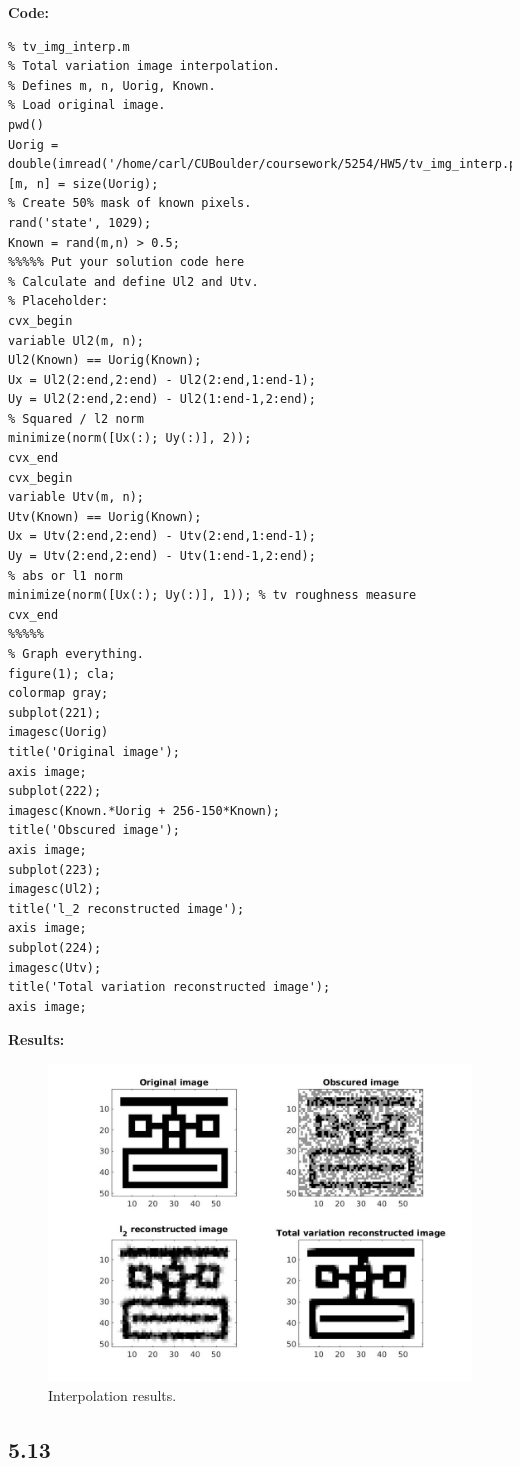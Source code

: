 \documentclass[12pt]{article}
\begin{document}
\textbf{Code:}
\begin{lstlisting}
% tv_img_interp.m
% Total variation image interpolation.
% Defines m, n, Uorig, Known.
% Load original image.
pwd()
Uorig = double(imread('/home/carl/CUBoulder/coursework/5254/HW5/tv_img_interp.png'));
[m, n] = size(Uorig);
% Create 50% mask of known pixels.
rand('state', 1029);
Known = rand(m,n) > 0.5;
%%%%% Put your solution code here
% Calculate and define Ul2 and Utv.
% Placeholder:
cvx_begin
variable Ul2(m, n);
Ul2(Known) == Uorig(Known);
Ux = Ul2(2:end,2:end) - Ul2(2:end,1:end-1);
Uy = Ul2(2:end,2:end) - Ul2(1:end-1,2:end);
% Squared / l2 norm
minimize(norm([Ux(:); Uy(:)], 2)); 
cvx_end
cvx_begin
variable Utv(m, n);
Utv(Known) == Uorig(Known);
Ux = Utv(2:end,2:end) - Utv(2:end,1:end-1);
Uy = Utv(2:end,2:end) - Utv(1:end-1,2:end);
% abs or l1 norm
minimize(norm([Ux(:); Uy(:)], 1)); % tv roughness measure
cvx_end
%%%%%
% Graph everything.
figure(1); cla;
colormap gray;
subplot(221);
imagesc(Uorig)
title('Original image');
axis image;
subplot(222);
imagesc(Known.*Uorig + 256-150*Known);
title('Obscured image');
axis image;
subplot(223);
imagesc(Ul2);
title('l_2 reconstructed image');
axis image;
subplot(224);
imagesc(Utv);
title('Total variation reconstructed image');
axis image;
\end{lstlisting}
\textbf{Results:}\\
\begin{figure}[h]
\centering
\includegraphics[scale=.30]{interpolation.jpg}
\caption{Interpolation results.}
\end{figure}

\subsection*{5.13}
\end{document}

